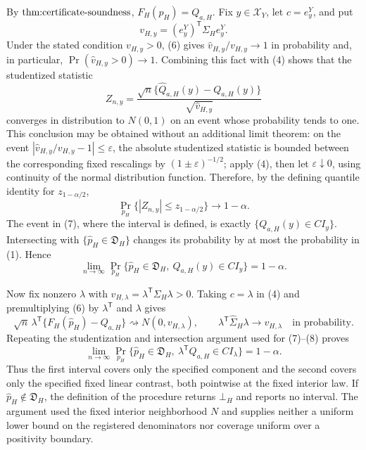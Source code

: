 By \(\textnormal{thm:certificate-soundness}\), \(F_H(p_H)=Q_{a,H}\).  Fix \(y\in\mathcal X_Y\), let \(c=e_y^Y\), and put
\[
 v_{H,y}=(e_y^Y)^{\mathsf T}\Sigma_H e_y^Y.
\]
Under the stated condition \(v_{H,y}>0\), (6) gives \(\widehat v_{H,y}/v_{H,y}\to1\) in probability and, in particular, \(\Pr(\widehat v_{H,y}>0)\to1\).  Combining this fact with (4) shows that the studentized statistic
\[
 Z_{n,y}=
 \frac{\sqrt n\{\widehat Q_{a,H}(y)-Q_{a,H}(y)\}}
 {\sqrt{\widehat v_{H,y}}}
\]
converges in distribution to \(N(0,1)\) on an event whose probability tends to one.  This conclusion may be obtained without an additional limit theorem: on the event \(|\widehat v_{H,y}/v_{H,y}-1|\leq\varepsilon\), the absolute studentized statistic is bounded between the corresponding fixed rescalings by \((1\pm\varepsilon)^{-1/2}\); apply (4), then let \(\varepsilon\downarrow0\), using continuity of the normal distribution function.  Therefore, by the defining quantile identity for \(z_{1-\alpha/2}\),
\[
 \Pr_{p_H}\{|Z_{n,y}|\leq z_{1-\alpha/2}\}\longrightarrow1-\alpha. \tag{7}
\]
The event in (7), where the interval is defined, is exactly \(\{Q_{a,H}(y)\in CI_y\}\).  Intersecting with \(\{\widehat p_H\in\mathfrak D_H\}\) changes its probability by at most the probability in (1).  Hence
\[
 \lim_{n\to\infty}\Pr_{p_H}\{\widehat p_H\in\mathfrak D_H,
 \ Q_{a,H}(y)\in CI_y\}=1-\alpha. \tag{8}
\]

Now fix nonzero \(\lambda\) with \(v_{H,\lambda}=\lambda^{\mathsf T}\Sigma_H\lambda>0\).  Taking \(c=\lambda\) in (4) and premultiplying (6) by \(\lambda^{\mathsf T}\) and \(\lambda\) gives
\[
 \sqrt n\,\lambda^{\mathsf T}\{F_H(\widehat p_H)-Q_{a,H}\}
 \rightsquigarrow N(0,v_{H,\lambda}),
 \qquad
 \lambda^{\mathsf T}\widehat\Sigma_H\lambda
 \longrightarrow v_{H,\lambda}
 \quad\text{in probability}.
\]
Repeating the studentization and intersection argument used for (7)--(8) proves
\[
 \lim_{n\to\infty}\Pr_{p_H}\{\widehat p_H\in\mathfrak D_H,
 \ \lambda^{\mathsf T}Q_{a,H}\in CI_{\lambda}\}=1-\alpha.
\]
Thus the first interval covers only the specified component and the second covers only the specified fixed linear contrast, both pointwise at the fixed interior law.  If \(\widehat p_H\notin\mathfrak D_H\), the definition of the procedure returns \(\bot_H\) and reports no interval.  The argument used the fixed interior neighborhood \(N\) and supplies neither a uniform lower bound on the registered denominators nor coverage uniform over a positivity boundary.
